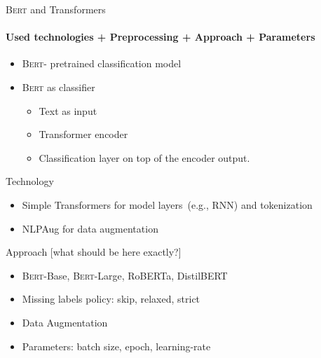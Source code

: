 \documentclass[english,handout]{mlutalk}
\newcommand{\Bert}{\textsc{Bert}\xspace}
\newcommand{\todo}[1]{{\smaller\color{red}[#1]}}
\begin{document}
\begin{frame}{\Bert and Transformers}
  \framesubtitle{Used technologies + Preprocessing + Approach + Parameters}

  \begin{itemize}
    \item \Bert - pretrained classification model~\cite{devlin-etal-2019-bert}
    \item \Bert as classifier
    	\begin{itemize}
    		\item Text as input
    		\item Transformer encoder
    		\item Classification layer on top of the encoder output.
    	\end{itemize}
  \end{itemize}
  
  \begin{block}{Technology}
    \begin{itemize}
      \item Simple Transformers\cite{Rajapaske2019} for model layers~(e.g., RNN) and tokenization
      \item NLPAug\cite{Edward2019} for data augmentation
    \end{itemize}
  \end{block}
  
    \begin{block}{Approach \todo{what should be here exactly?}}
    \begin{itemize}
    		\item \Bert -Base, \Bert -Large, RoBERTa, DistilBERT
    		\item Missing labels policy: skip, relaxed, strict
    		\item Data Augmentation
    		\item Parameters: batch size, epoch, learning-rate
    \end{itemize}
    
  \end{block}

\end{frame}
\end{document}
